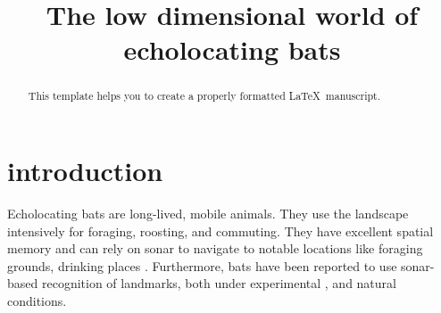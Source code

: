 \documentclass[preprint,5p]{elsarticle}
\begin{document}
\newcommand{\pca}{25}
\newcommand{\prepca}{92}
\newcommand{\nneurons}{200}
\newcommand{\nweights}{37 thousand}

\newcommand{\noise}{\mathcal{N}}
\newcommand{\noisefloor}{\mathcal{N}_f}
\newcommand{\stochasticnoise}{\mathcal{N}_s}
\newcommand{\db}{dB}

\begin{frontmatter}

\title{The low dimensional world of echolocating bats}






\begin{abstract}
This template helps you to create a properly formatted \LaTeX\ manuscript.
\end{abstract}


\end{frontmatter}


\section{introduction}

Echolocating bats are long-lived, mobile animals. They use the landscape intensively for foraging, roosting, and commuting. They have excellent spatial memory \citep{Barchi2013,VonHelversen2005} and can rely on sonar to navigate to notable locations like foraging grounds, drinking places \citep[see][for references]{Vanderelst2016,Vanderelst2017}. Furthermore, bats have been reported to use sonar-based recognition of landmarks, both under experimental \citep{Jensen2005,Yu2019}, and natural \citep{Verboom1999} conditions.
\end{document}
